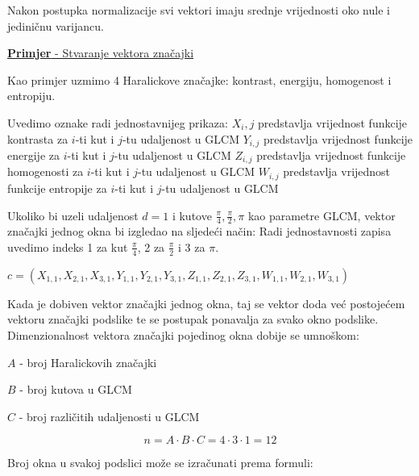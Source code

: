 \documentclass[times, utf8, zavrsni]{fer}
\begin{document}
Nakon postupka normalizacije svi vektori imaju srednje vrijednosti oko nule
i jediničnu varijancu. 

\bigbreak
\underline{\textbf{Primjer} - Stvaranje vektora značajki}
\bigbreak

Kao primjer uzmimo 4 Haralickove značajke: kontrast, energiju, homogenost i entropiju. 

\bigbreak

Uvedimo oznake radi jednostavnijeg prikaza: 
\newline \(X_i,j\) predstavlja vrijednost funkcije kontrasta za \(i\)-ti
kut i \(j\)-tu udaljenost u GLCM
\newline \(Y_{i,j}\) predstavlja vrijednost funkcije energije za \(i\)-ti
kut i \(j\)-tu udaljenost u GLCM
\newline \(Z_{i,j}\) predstavlja vrijednost funkcije homogenosti za \(i\)-ti
kut i \(j\)-tu udaljenost u GLCM
\newline \(W_{i,j}\) predstavlja vrijednost funkcije entropije za \(i\)-ti
kut i \(j\)-tu udaljenost u GLCM

\bigbreak

Ukoliko bi uzeli udaljenost \(d=1\) i kutove \(\frac{\pi}{4}, \frac{\pi}{2}, \pi\)
kao parametre GLCM, vektor značajki jednog okna bi izgledao na sljedeći način:
\bigbreak
Radi jednostavnosti zapisa uvedimo indeks 1 za kut \(\frac{\pi}{4}\), 2 za
\(\frac{\pi}{2}\) i 3 za \(\pi\).

\bigbreak

\(
c = \left(X_{1,1}, X_{2,1}, X_{3,1}, Y_{1,1}, Y_{2,1}, Y_{3,1}, Z_{1,1}, 
Z_{2,1}, Z_{3,1}, W_{1,1}, W_{2,1}, W_{3,1}\right)
\)

\bigbreak

Kada je dobiven vektor značajki jednog okna, taj se vektor doda već postojećem 
vektoru značajki podslike te se postupak ponavalja za svako okno podslike.
\newline
Dimenzionalnost vektora značajki pojedinog okna dobije se umnoškom:

\begin{center}

\(A\) - broj Haralickovih značajki

\(B\) - broj kutova u GLCM

\(C\) - broj različitih udaljenosti u GLCM

\end{center}
\[
n = A \cdot B \cdot C = 4 \cdot 3 \cdot 1 = 12
\]

Broj okna u svakoj podslici može se izračunati prema formuli:
\end{document}
